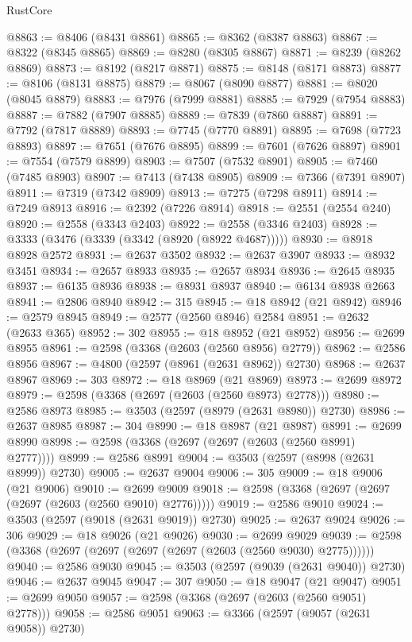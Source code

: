 \begin{lexlean}{RustCore}
\begin{coremodule}
@8863 := @8406 (@8431 @8861)
@8865 := @8362 (@8387 @8863)
@8867 := @8322 (@8345 @8865)
@8869 := @8280 (@8305 @8867)
@8871 := @8239 (@8262 @8869)
@8873 := @8192 (@8217 @8871)
@8875 := @8148 (@8171 @8873)
@8877 := @8106 (@8131 @8875)
@8879 := @8067 (@8090 @8877)
@8881 := @8020 (@8045 @8879)
@8883 := @7976 (@7999 @8881)
@8885 := @7929 (@7954 @8883)
@8887 := @7882 (@7907 @8885)
@8889 := @7839 (@7860 @8887)
@8891 := @7792 (@7817 @8889)
@8893 := @7745 (@7770 @8891)
@8895 := @7698 (@7723 @8893)
@8897 := @7651 (@7676 @8895)
@8899 := @7601 (@7626 @8897)
@8901 := @7554 (@7579 @8899)
@8903 := @7507 (@7532 @8901)
@8905 := @7460 (@7485 @8903)
@8907 := @7413 (@7438 @8905)
@8909 := @7366 (@7391 @8907)
@8911 := @7319 (@7342 @8909)
@8913 := @7275 (@7298 @8911)
@8914 := @7249 @8913
@8916 := @2392 (@7226 @8914)
@8918 := @2551 (@2554 @240)
@8920 := @2558 (@3343 @2403)
@8922 := @2558 (@3346 @2403)
@8928 := @3333 (@3476 (@3339 (@3342 (@8920 (@8922 @4687)))))
@8930 := @8918 @8928 @2572
@8931 := @2637 @3502
@8932 := @2637 @3907
@8933 := @8932 @3451
@8934 := @2657 @8933
@8935 := @2657 @8934
@8936 := @2645 @8935
@8937 := @6135 @8936
@8938 := @8931 @8937
@8940 := @6134 @8938 @2663
@8941 := @2806 @8940
@8942 := 315
@8945 := @18 @8942 (@21 @8942)
@8946 := @2579 @8945
@8949 := @2577 (@2560 @8946) @2584
@8951 := @2632 (@2633 @365)
@8952 := 302
@8955 := @18 @8952 (@21 @8952)
@8956 := @2699 @8955
@8961 := @2598 (@3368 (@2603 (@2560 @8956) @2779))
@8962 := @2586 @8956
@8967 := @4800 (@2597 (@8961 (@2631 @8962)) @2730)
@8968 := @2637 @8967
@8969 := 303
@8972 := @18 @8969 (@21 @8969)
@8973 := @2699 @8972
@8979 := @2598 (@3368 (@2697 (@2603 (@2560 @8973) @2778)))
@8980 := @2586 @8973
@8985 := @3503 (@2597 (@8979 (@2631 @8980)) @2730)
@8986 := @2637 @8985
@8987 := 304
@8990 := @18 @8987 (@21 @8987)
@8991 := @2699 @8990
@8998 := @2598 (@3368 (@2697 (@2697 (@2603 (@2560 @8991) @2777))))
@8999 := @2586 @8991
@9004 := @3503 (@2597 (@8998 (@2631 @8999)) @2730)
@9005 := @2637 @9004
@9006 := 305
@9009 := @18 @9006 (@21 @9006)
@9010 := @2699 @9009
@9018 := @2598 (@3368 (@2697 (@2697 (@2697 (@2603 (@2560 @9010) @2776)))))
@9019 := @2586 @9010
@9024 := @3503 (@2597 (@9018 (@2631 @9019)) @2730)
@9025 := @2637 @9024
@9026 := 306
@9029 := @18 @9026 (@21 @9026)
@9030 := @2699 @9029
@9039 := @2598 (@3368 (@2697 (@2697 (@2697 (@2697 (@2603 (@2560 @9030) @2775))))))
@9040 := @2586 @9030
@9045 := @3503 (@2597 (@9039 (@2631 @9040)) @2730)
@9046 := @2637 @9045
@9047 := 307
@9050 := @18 @9047 (@21 @9047)
@9051 := @2699 @9050
@9057 := @2598 (@3368 (@2697 (@2603 (@2560 @9051) @2778)))
@9058 := @2586 @9051
@9063 := @3366 (@2597 (@9057 (@2631 @9058)) @2730)

\end{coremodule}
\end{lexlean}
